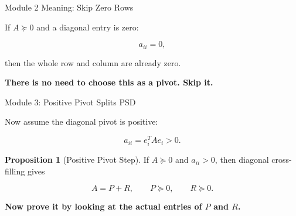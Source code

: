 \documentclass[10pt]{beamer}
\theoremstyle{definition}
\newtheorem{prop}{Proposition}[section]
\newcommand{\x}[1]{\alert{\textbf{#1}}}
\newcommand{\rd}[1]{{\color{red!70!black}#1}}
\begin{document}
\begin{frame}{Module 2 Meaning: Skip Zero Rows}

If $A\succeq0$ and a diagonal entry is zero:

$$
a_{ii}=0,
$$

then the whole row and column are already zero.

\vfill

\begin{center}
\end{center}

\vfill

\begin{center}
\x{There is no need to choose this as a pivot. Skip it.}
\end{center}

\end{frame}


\begin{frame}{Module 3: Positive Pivot Splits PSD}

Now assume the diagonal pivot is positive:

$$
a_{ii}=e_i^TAe_i>0.
$$

\vfill

\begin{prop}[Positive Pivot Step]
If $A\succeq0$ and $a_{ii}>0$, then diagonal cross-filling gives

$$
A=P+R,\qquad P\succeq0,\qquad R\succeq0.
$$

\end{prop}

\vfill

\begin{center}
\x{Now prove it by looking at the actual entries of $P$ and $R$.}
\end{center}

\end{frame}
\end{document}
